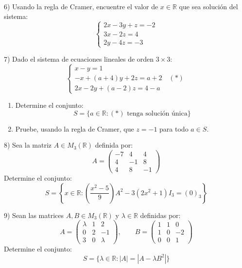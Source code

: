 \documentclass[letterpaper, 12pt]{article}
\newenvironment{ejercicios}{}{}
\begin{document}
\begin{ejercicios}
\vspace{0.5cm}

6) Usando la regla de Cramer, encuentre el valor de $x \in \mathbb{R}$ que sea solución del sistema:
$$ \begin{cases} 2x - 3y + z = -2 \\ 3x - 2z = 4 \\ 2y - 4z = -3 \end{cases} $$

\vspace{0.5cm}

7) Dado el sistema de ecuaciones lineales de orden $3 \times 3$:
$$ \begin{cases} x - y = 1 \\ -x + (a + 4)y + 2z = a + 2 \quad (*) \\ 2x - 2y + (a - 2)z = 4 - a \end{cases} $$
\begin{enumerate}[label=(\alph*), leftmargin=1.2cm, itemsep=0.5em]
    \item Determine el conjunto:
    $$ S = \{a \in \mathbb{R} : (*) \text{ tenga solución única}\} $$
    \item Pruebe, usando la regla de Cramer, que $z = -1$ para todo $a \in S$.
\end{enumerate}

\vspace{0.5cm}

\newpage
\thispagestyle{fancy}
8) Sea la matriz $A \in M_3(\mathbb{R})$ definida por:
$$ A = \begin{pmatrix} -7 & 4 & 4 \\ 4 & -1 & 8 \\ 4 & 8 & -1 \end{pmatrix} $$
Determine el conjunto:
$$ S = \left\{ x \in \mathbb{R} : \left(\frac{x^2 - 5}{9}\right) A^2 - 3(2x^2 + 1)I_3 = (0)_3 \right\} $$

\vspace{0.5cm}

9) Sean las matrices $A, B \in M_3(\mathbb{R})$ y $\lambda \in \mathbb{R}$ definidas por:
$$ A = \begin{pmatrix} \lambda & 1 & 2 \\ 0 & 2 & -1 \\ 3 & 0 & \lambda \end{pmatrix}, \qquad B = \begin{pmatrix} 1 & 1 & 0 \\ 1 & 0 & -2 \\ 0 & 0 & 1 \end{pmatrix} $$
Determine el conjunto:
$$ S = \{ \lambda \in \mathbb{R} : |A| = |A - \lambda B^2| \} $$


\end{ejercicios}
\end{document}
